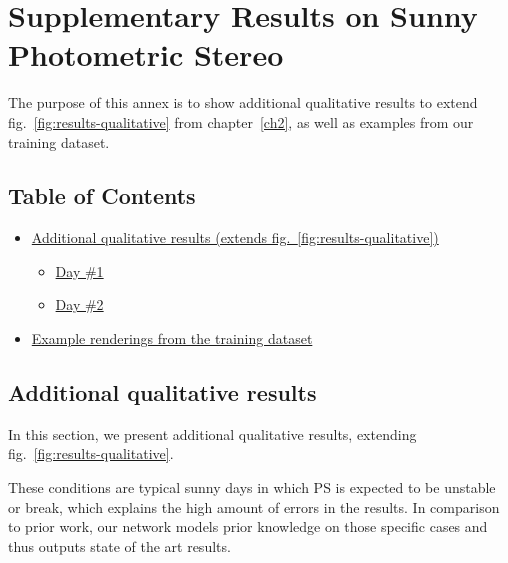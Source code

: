 \chapter{Supplementary Results on Sunny Photometric Stereo}     %
\label{annex3}

\graphicspath{{annex3_figures/}}

The purpose of this annex is to show additional qualitative results
to extend fig.~\ref{fig:results-qualitative} from chapter~\ref{ch2}, as well as examples from our training dataset.

\hypertarget{an3-table-of-contents}{%
\section*{Table of Contents}\label{an3-table-of-contents}}

\begin{itemize}
\item\hyperlink{extraresults}{Additional qualitative results (extends
fig.~\ref{fig:results-qualitative})}
\begin{itemize}
\tightlist
\item
  \protect\hyperlink{extraresultsd2}{Day \#1}
\item
  \protect\hyperlink{extraresultsd2}{Day \#2}
\end{itemize}
\item\hyperlink{trainingrenders}{Example renderings from the training
dataset}
\end{itemize}

\protect\hypertarget{extraresults}{}{}

\hypertarget{additional-qualitative-results}{%
\section{Additional qualitative
results}\label{additional-qualitative-results}}

In this section, we present additional qualitative results, extending
fig.~\ref{fig:results-qualitative}.

These conditions are typical sunny days in which PS is expected to be
unstable or break, which explains the high amount of errors in the
results. In comparison to prior work, our network models prior knowledge
on those specific cases and thus outputs state of the art results.

\clearpage


